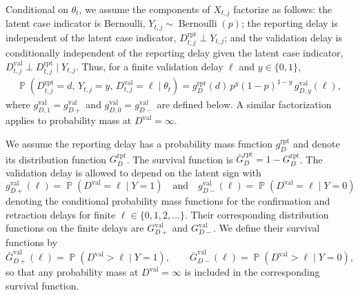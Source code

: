 \documentclass{article}
\theoremstyle{definition}
\theoremstyle{remark}
\newcommand{\Prb}{\operatorname{\mathbb{P}}}
\begin{document}
Conditional on $\theta_t$, we assume the components of $X_{t,j}$ factorize as follows: the latent case indicator is Bernoulli, $Y_{t,j}\sim\operatorname{Bernoulli}(p)$; the reporting delay is independent of the latent case indicator, $D_{t,j}^{\mathrm{rpt}}\perp Y_{t,j}$; and the validation delay is conditionally independent of the reporting delay given the latent case indicator, $D_{t,j}^{\mathrm{val}}\perp D_{t,j}^{\mathrm{rpt}}\mid Y_{t,j}$. Thus, for a finite validation delay $\ell$ and $y\in\{0,1\}$,
\begin{equation}\label{markfactorization}
\begin{split}
\Prb\left(D_{t,j}^{\mathrm{rpt}}=d,\,Y_{t,j}=y,\,D_{t,j}^{\mathrm{val}}=\ell\mid\theta_t\right)
= g_D^{\mathrm{rpt}}(d)\,p^y(1-p)^{1-y}\,g_{D,y}^{\mathrm{val}}(\ell),
\end{split}
\end{equation}
where $g_{D,1}^{\mathrm{val}}=g_{D+}^{\mathrm{val}}$ and $g_{D,0}^{\mathrm{val}}=g_{D-}^{\mathrm{val}}$ are defined below. A similar factorization applies to probability mass at $D^{\mathrm{val}}=\infty$. 

We assume the reporting delay has a probability mass function $g_D^{\text{rpt}}$ and denote its distribution function $G_D^{\text{rpt}}$. The survival function is $\bar{G}_D^{\text{rpt}} = 1 - G_D^{\text{rpt}}$. The validation delay is allowed to depend on the latent sign with
\begin{equation}
    g_{D+}^{\text{val}}(\ell) = \Prb(D^{\text{val}} = \ell \mid Y = 1) 
    \quad \text{and} \quad 
    g_{D-}^{\text{val}}(\ell) = \Prb(D^{\text{val}} = \ell \mid Y = 0)
\end{equation}
denoting the conditional probability mass functions for the confirmation and retraction delays for finite $\ell \in \{0,1,2,\dots\}$. Their corresponding distribution functions on the finite delays are $G_{D+}^{\text{val}}$ and $G_{D-}^{\text{val}}$. We define their survival functions by
\begin{equation}
    \bar G_{D+}^{\text{val}}(\ell)
    = \Prb(D^{\text{val}} > \ell \mid Y=1),
    \qquad
    \bar G_{D-}^{\text{val}}(\ell)
    = \Prb(D^{\text{val}} > \ell \mid Y=0),
\end{equation}
so that any probability mass at $D^{\text{val}}=\infty$ is included in the corresponding survival function.
\end{document}
